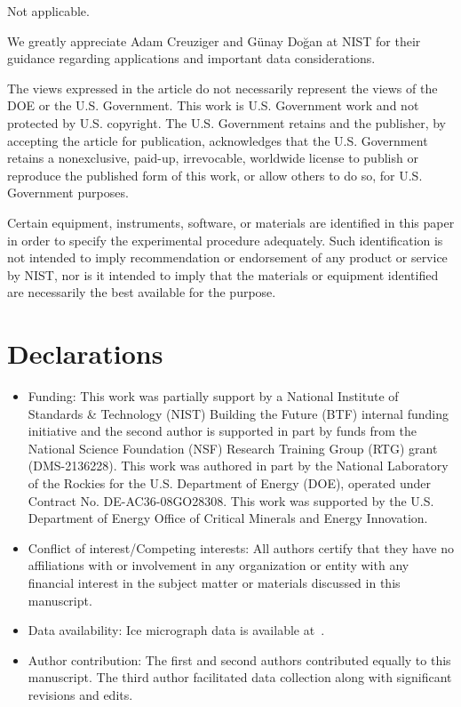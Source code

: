\documentclass[pdflatex,iicol]{sn-jnl}%
\theoremstyle{thmstyleone}%
\theoremstyle{thmstyletwo}%
\theoremstyle{thmstylethree}%
\begin{document}
\backmatter

Not applicable.

We greatly appreciate Adam Creuziger and G\"unay Do\u{g}an at NIST for their guidance regarding applications and important data considerations. 

The views expressed in the article do not necessarily represent the views of the DOE or the U.S. Government. This work is U.S. Government work and not protected by U.S. copyright. The U.S. Government retains and the publisher, by accepting the article for publication, acknowledges that the U.S. Government retains a nonexclusive, paid-up, irrevocable, worldwide license to publish or reproduce the published form of this work, or allow others to do so, for U.S. Government purposes.

Certain equipment, instruments, software, or materials are identified in this paper in order to specify the experimental procedure adequately. Such identification is not intended to imply recommendation or endorsement of any product or service by NIST, nor is it intended to imply that the materials or equipment identified are necessarily the best available for the purpose.


\section*{Declarations}

\begin{itemize}
\item Funding: This work was partially support by a National Institute of Standards \& Technology (NIST) Building the Future (BTF) internal funding initiative and the second author is supported in part by funds from the National Science Foundation (NSF) Research Training Group (RTG) grant (DMS-2136228). This work was authored in part by the National Laboratory of the Rockies for the U.S. Department of Energy (DOE), operated under Contract No. DE-AC36-08GO28308. This work was supported by the U.S. Department of Energy Office of Critical Minerals and Energy Innovation. 
\item Conflict of interest/Competing interests: All authors certify that they have no affiliations with or involvement in any organization or entity with any financial interest in the subject matter or materials discussed in this manuscript.
\item Data availability: Ice micrograph data is available at~\cite{Fan2020}. 
\item Author contribution: The first and second authors contributed equally to this manuscript. The third author facilitated data collection along with significant revisions and edits.
\end{itemize}
\end{document}
